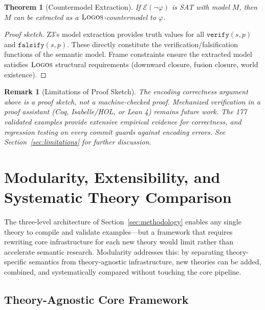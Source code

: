 \documentclass[pdflatex,sn-mathphys-num]{sn-jnl}
\newcommand{\lneg}{\neg}                    %
\newcommand{\theorylogos}{\textsc{Logos}}
\newcommand{\zverify}{\texttt{verify}}
\newcommand{\zfalsify}{\texttt{falsify}}
\theoremstyle{thmstyleone}
\newtheorem{theorem}{Theorem}
\theoremstyle{thmstyletwo}
\newtheorem{remark}{Remark}
\theoremstyle{thmstylethree}
\begin{document}
\begin{theorem}[Countermodel Extraction]\label{thm:countermodel}
If $\mathcal{E}(\lneg \varphi)$ is SAT with model $M$, then $M$ can be extracted as a $\theorylogos$-countermodel to $\varphi$.
\end{theorem}

\begin{proof}[Proof sketch]
Z3's model extraction provides truth values for all $\zverify(s, p)$ and $\zfalsify(s, p)$.
These directly constitute the verification/falsification functions of the semantic model.
Frame constraints ensure the extracted model satisfies $\theorylogos$ structural requirements (downward closure, fusion closure, world existence).
\end{proof}

\begin{remark}[Limitations of Proof Sketch]
The encoding correctness argument above is a proof sketch, not a machine-checked proof.
Mechanized verification in a proof assistant (Coq, Isabelle/HOL, or Lean 4) remains future work.
The 177 validated examples provide extensive empirical evidence for correctness, and regression testing on every commit guards against encoding errors.
See Section~\ref{sec:limitations} for further discussion.
\end{remark}


\section{Modularity, Extensibility, and Systematic Theory Comparison}\label{sec:modularity}

The three-level architecture of Section~\ref{sec:methodology} enables any single theory to compile and validate examples---but a framework that requires rewriting core infrastructure for each new theory would limit rather than accelerate semantic research.
Modularity addresses this: by separating theory-specific semantics from theory-agnostic infrastructure, new theories can be added, combined, and systematically compared without touching the core pipeline.

\subsection{Theory-Agnostic Core Framework}\label{sec:theory-agnostic}
\end{document}

